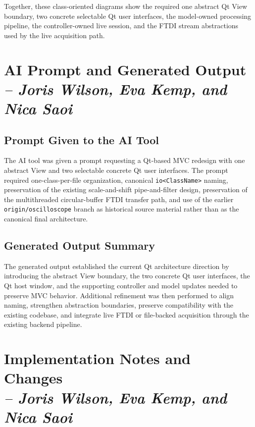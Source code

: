 Together, these class-oriented diagrams show the required one abstract Qt View boundary, two concrete selectable Qt user interfaces, the model-owned processing pipeline, the controller-owned live session, and the FTDI stream abstractions used by the live acquisition path.

\section{AI Prompt and Generated Output \\
\small{\textit{-- Joris Wilson, Eva Kemp, and Nica Saoi}}}
\label{Section::AI Prompt and Generated Output}

\subsection{Prompt Given to the AI Tool}
The AI tool was given a prompt requesting a Qt-based MVC redesign with one abstract View and two selectable concrete Qt user interfaces. The prompt required one-class-per-file organization, canonical \texttt{io<ClassName>} naming, preservation of the existing scale-and-shift pipe-and-filter design, preservation of the multithreaded circular-buffer FTDI transfer path, and use of the earlier \texttt{origin/oscilloscope} branch as historical source material rather than as the canonical final architecture.

\subsection{Generated Output Summary}
The generated output established the current Qt architecture direction by introducing the abstract View boundary, the two concrete Qt user interfaces, the Qt host window, and the supporting controller and model updates needed to preserve MVC behavior. Additional refinement was then performed to align naming, strengthen abstraction boundaries, preserve compatibility with the existing codebase, and integrate live FTDI or file-backed acquisition through the existing backend pipeline.

\section{Implementation Notes and Changes \\
\small{\textit{-- Joris Wilson, Eva Kemp, and Nica Saoi}}}
\label{Section::Implementation Notes and Changes}

